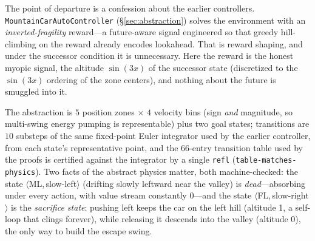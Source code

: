 \documentclass[9pt,a4paper]{article}
\theoremstyle{plain}
\theoremstyle{definition}
\theoremstyle{remark}
\begin{document}
The point of departure is a confession about the earlier controllers.  \texttt{MountainCarAutoController} (\S\ref{sec:abstraction}) solves the environment with an \emph{inverted-fragility} reward---a future-aware signal engineered so that greedy hill-climbing on the reward already encodes lookahead.  That is reward shaping, and under the successor condition it is unnecessary.  Here the reward is the honest myopic signal, the altitude $\sin(3x)$ of the successor state (discretized to the $\sin(3x)$ ordering of the zone centers), and nothing about the future is smuggled into it.

The abstraction is $5$ position zones $\times$ $4$ velocity bins (sign \emph{and} magnitude, so multi-swing energy pumping is representable) plus two goal states; transitions are $10$ substeps of the same fixed-point Euler integrator used by the earlier controller, from each state's representative point, and the $66$-entry transition table used by the proofs is certified against the integrator by a single \texttt{refl} (\texttt{table-matches-physics}).  Two facts of the abstract physics matter, both machine-checked: the state $\langle$ML,\,slow-left$\rangle$ (drifting slowly leftward near the valley) is \emph{dead}---absorbing under every action, with value stream constantly $0$---and the state $\langle$FL,\,slow-right$\rangle$ is the \emph{sacrifice state}: pushing left keeps the car on the left hill (altitude 1, a self-loop that clings forever), while releasing it descends into the valley (altitude 0), the only way to build the escape swing.
\end{document}
